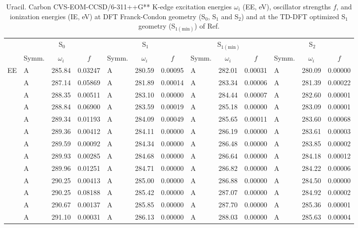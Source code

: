 \documentclass[journal=jctcce,manuscript=article]{achemso}
\begin{document}
\begin{table}
\caption{Uracil.  Carbon CVS-EOM-CCSD/6-311++G** K-edge excitation energies $\omega_i$ (EE, eV), oscillator strengths $f$, and ionization energies (IE, eV) at DFT Franck-Condon geometry (S$_0$, S$_1$ and S$_2$) and at the TD-DFT optimized S$_1$ geometry (S$_{1(\text{min})}$) of Ref. 
\label{Tab:Uracil_DFT:Carbon}}
\scriptsize
\begin{tabular}{l|lcc|lcc|lcc|lcc}
\cline{2-13}
& \multicolumn{3}{c|}{S$_0$}
& \multicolumn{3}{c|}{S$_1$}  
& \multicolumn{3}{c|}{S$_{1(\text{min})}$}
& \multicolumn{3}{c}{S$_2$}
\\
\cline{2-13}
& Symm. & $\omega_i$ & $f$ 
& Symm. & $\omega_i$ & $f$ 
& Symm. & $\omega_i$ & $f$ 
& Symm. & $\omega_i$ & $f$\\
\hline
  EE 
& A & 285.84 & 0.03247 & A & 280.59 & 0.00095 & A & 282.01 & 0.00031 & A & 280.09 & 0.00000 \\ 
& A & 287.14 & 0.05869 & A & 281.89 & 0.00014 & A & 283.34 & 0.00006 & A & 281.39 & 0.00022 \\ 
& A & 288.35 & 0.00511 & A & 283.10 & 0.00000 & A & 284.44 & 0.00007 & A & 282.60 & 0.00001 \\ 
& A & 288.84 & 0.06900 & A & 283.59 & 0.00019 & A & 285.18 & 0.00000 & A & 283.09 & 0.00001 \\ 
& A & 289.34 & 0.01193 & A & 284.09 & 0.00049 & A & 285.65 & 0.00011 & A & 283.60 & 0.00068 \\ 
& A & 289.36 & 0.00412 & A & 284.11 & 0.00000 & A & 286.19 & 0.00000 & A & 283.61 & 0.00003 \\ 
& A & 289.59 & 0.00092 & A & 284.34 & 0.00000 & A & 286.48 & 0.00000 & A & 283.85 & 0.00002 \\ 
& A & 289.93 & 0.00285 & A & 284.68 & 0.00000 & A & 286.64 & 0.00000 & A & 284.18 & 0.00012 \\ 
& A & 289.96 & 0.01251 & A & 284.71 & 0.00000 & A & 286.82 & 0.00000 & A & 284.22 & 0.00006 \\ 
& A & 290.25 & 0.00413 & A & 285.00 & 0.00000 & A & 286.88 & 0.00000 & A & 284.50 & 0.00000 \\ 
& A & 290.25 & 0.08188 & A & 285.42 & 0.00000 & A & 287.07 & 0.00000 & A & 284.92 & 0.00002 \\ 
& A & 290.67 & 0.00137 & A & 285.85 & 0.00000 & A & 287.70 & 0.00000 & A & 285.36 & 0.00001 \\ 
& A & 291.10 & 0.00031 & A & 286.13 & 0.00000 & A & 288.03 & 0.00000 & A & 285.63 & 0.00004 \\ 

\end{tabular}
\end{table}
\end{document}
